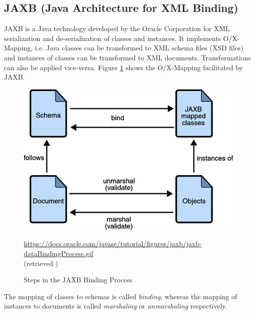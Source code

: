 \subsection{JAXB (Java Architecture for XML Binding)}
\label{subsection:JAXB}
\Gls{JAXB} \cite{JAXB} \cite{JAXBTutorial}
is a \gls{Java} technology developed by the Oracle Corporation for \gls{XML} serialization and de-serialization of classes and instances.
It implements \gls{O/X-Mapping}, i.e. \gls{Java} classes can be transformed to \gls{XML} schema files (\gls{XSD} files) and instances of classes can be transformed to \gls{XML} documents.
Transformations can also be applied vice-versa.
Figure \ref{figure:JAXBDataBindingProcess} shows the \gls{O/X-Mapping} facilitated by \gls{JAXB}.
\begin{figure}[h!]
\begin{center}
\includegraphics[width=\textwidth]{images/jaxb-dataBindingProcess.png}
\end{center}
{
\scriptsize
\begin{center}
\url{https://docs.oracle.com/javase/tutorial/figures/jaxb/jaxb-dataBindingProcess.gif}\\(retrieved )
\end{center}
}
\caption{Steps in the JAXB Binding Process \cite{jaxbDataBindingProcess}}
\label{figure:JAXBDataBindingProcess}
\end{figure}
The mapping of classes to schemas is called \textit{binding}, whereas the mapping of instances to documents is called \textit{marshaling} or \textit{unmarshaling} respectively.


